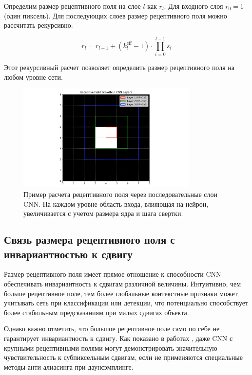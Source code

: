 Определим размер рецептивного поля на слое $l$ как $r_l$. Для входного слоя $r_0 = 1$ (один пиксель). Для последующих слоев размер рецептивного поля можно рассчитать рекурсивно:

\begin{equation}
r_l = r_{l-1} + (k_l^{\text{eff}} - 1) \cdot \prod_{i=0}^{l-1} s_i
\end{equation}

Этот рекурсивный расчет позволяет определить размер рецептивного поля на любом уровне сети.

\begin{figure}[ht]
\centering
\includegraphics[width=0.8\textwidth]{Dissertation/images/receptive_field_diagram.png}
\caption{Пример расчета рецептивного поля через последовательные слои CNN. На каждом уровне область входа, влияющая на нейрон, увеличивается с учетом размера ядра и шага свертки.}
\label{fig:receptive_field_diagram}
\end{figure}

\subsection{Связь размера рецептивного поля с инвариантностью к сдвигу}
\label{theory:receptive_fields:shift_invariance}

Размер рецептивного поля имеет прямое отношение к способности CNN обеспечивать инвариантность к сдвигам различной величины. Интуитивно, чем больше рецептивное поле, тем более глобальные контекстные признаки может учитывать сеть при классификации или детекции, что потенциально способствует более стабильным предсказаниям при малых сдвигах объекта.

Однако важно отметить, что большое рецептивное поле само по себе не гарантирует инвариантность к сдвигу. Как показано в работах \cite{Zhang2019, Azulay2019}, даже CNN с крупными рецептивными полями могут демонстрировать значительную чувствительность к субпиксельным сдвигам, если не применяются специальные методы анти-алиасинга при даунсэмплинге.

